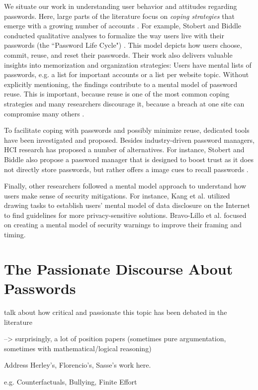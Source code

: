 	We situate our work in understanding user behavior and attitudes regarding passwords. Here, large parts of the literature focus on \textit{coping strategies} that emerge with a growing number of accounts \cite{Florencio2007LargeScaleStudyPasswordHabits, Florencio2014PasswordPortfoliosFiniteUser}. For example, Stobert and Biddle conducted qualitative analyses to formalize the way users live with their passwords (the ``Password Life Cycle") \cite{Stobert2014PasswordLifeCycle}. This model depicts how users choose, commit, reuse, and reset their passwords. Their work also delivers valuable insights into memorization and organization strategies: Users have mental lists of passwords, e.g. a list for important accounts or a list per website topic. Without explicitly mentioning, the findings contribute to a mental model of password reuse. This is important, because reuse is one of the most common coping strategies \cite{Das2014TangledWeb, Gaw2006PasswordManagement, Hayashi2011DiaryStudyPWs} and many researchers discourage it, because a breach at one site can compromise many others \cite{Bonneau2012ScienceOfGuessing, Komanduri2011OfPasswordsAndPeople}. 
	
	To facilitate coping with passwords and possibly minimize reuse, dedicated tools have been investigated and proposed. Besides industry-driven password managers, HCI research has proposed a number of alternatives. For instance, Stobert and Biddle also propose a password manager that is designed to boost trust as it does not directly store passwords, but rather offers a image cues to recall passwords \cite{Stobert2014PWMThatDoesntRemember}. 
	
	Finally, other researchers followed a mental model approach to understand how users make sense of security mitigations. For instance, Kang et al. utilized drawing tasks to establish users' mental model of data disclosure on the Internet \cite{Kang2015MentalModelsDrawing} to find guidelines for more privacy-sensitive solutions. Bravo-Lillo et al. focused on creating a mental model of security warnings \cite{BravoLillo2011WarningsMentalModel} to improve their framing and timing.
	
	
	\cite{Bojinov2010KamouflagePWM}
	
	\cite{Fagan2017UsersConsiderationsPWMs}
	
	
	
\section{The Passionate Discourse About Passwords}\label{sec:rw:passionate_discourse}
talk about how critical and passionate this topic has been debated in the literature

--> surprisingly, a lot of position papers (sometimes pure argumentation, sometimes with mathematical/logical reasoning) 

Address Herley's, Florencio's, Sasse's work here. 

e.g. Counterfactuals, Bullying, Finite Effort 
